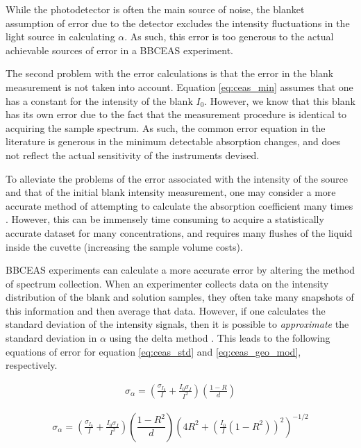 
While the photodetector is often the main source of noise, the blanket
assumption of error due to the detector excludes the intensity fluctuations in
the light source in calculating $\alpha$. As such, this error is too generous
to the actual achievable sources of error in a \ac{BBCEAS} experiment.

The second problem with the error calculations is that the error in the blank
measurement is not taken into account. Equation \eqref{eq:ceas_min} assumes
that one has a constant for the intensity of the blank $I_0$. However, we know
that this blank has its own error due to the fact that the measurement
procedure is identical to acquiring the sample spectrum. As such, the common
error equation in the literature is generous in the minimum detectable
absorption changes, and does not reflect the actual sensitivity of the
instruments devised.

To alleviate the problems of the error associated with the intensity of the
source and that of the initial blank intensity measurement, one may consider a
more accurate method of attempting to calculate the absorption coefficient many
times \cite{Islam:2007ea}. However, this can be immensely time consuming to
acquire a statistically accurate dataset for many concentrations, and requires
many flushes of the liquid inside the cuvette (increasing the sample volume
costs).

\ac{BBCEAS} experiments can calculate a more accurate error by altering the
method of spectrum collection. When an experimenter collects data on the
intensity distribution of the blank and solution samples, they often take many
snapshots of this information and then average that data. However, if one
calculates the standard deviation of the intensity signals, then it is possible
to \emph{approximate} the standard deviation in $\alpha$ using the delta method
\cite{Casella:2002tp}. This leads to the following equations of error for
equation \eqref{eq:ceas_std} and \eqref{eq:ceas_geo_mod}, respectively.

    \begin{align}
      \sigma_\alpha = \left(\frac{\sigma_{I_0}}{I} +
             \frac{I_0\sigma_I}{I^2}\right)
            \left(\frac{1-R}{d}\right)\label{eq:ceas_err_std}
    \end{align}


    \begin{align}
      \sigma_\alpha = \left(\frac{\sigma_{I_0}}{I} +
             \frac{I_0\sigma_I}{I^2}\right)
            \left(\dfrac{1-R^2}{d}\right)\left(4R^2+\left(
                                     \frac{I_0}{I}(1-R^2)\right)^2
                                     \right)^{-1/2}\label{eq:ceas_err_geo}
    \end{align}


